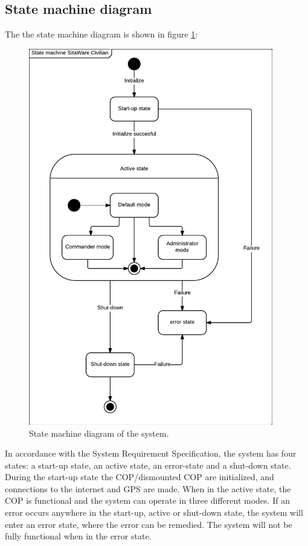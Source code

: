 \subsection{State machine diagram}
The the state machine diagram is shown in figure \ref{fig:state_diagram}:

\begin{figure}[H]
\centering
\includegraphics[width=0.95\textwidth]
{billeder/state_machine_pdd.pdf}
\caption{State machine diagram of the system.}
\label{fig:state_diagram}
\end{figure}

In accordance with the System Requirement Specification, the system has four states: a start-up state, an active state, an error-state and a shut-down state. During the start-up state the COP/dismounted COP are initialized, and connections to the internet and GPS are made. When in the active state, the COP is functional and the system can operate in three different modes. If an error occurs anywhere in the start-up, active or shut-down state, the system will enter an error state, where the error can be remedied. The system will not be fully functional when in the error state. 